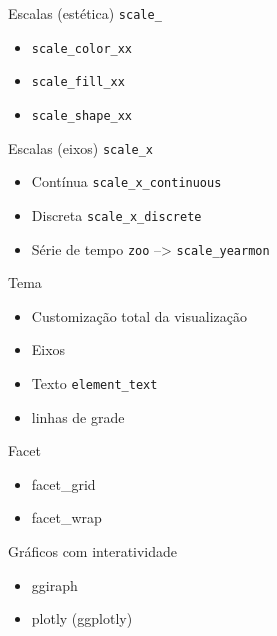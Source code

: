 \documentclass[
  9pt,
  ignorenonframetext,
]{beamer}
\begin{document}
\begin{frame}[fragile]{Escalas (estética) \texttt{scale\_}}
\protect\hypertarget{escalas-estuxe9tica-scale_}{}
\begin{itemize}
\item
  \texttt{scale\_color\_xx}
\item
  \texttt{scale\_fill\_xx}
\item
  \texttt{scale\_shape\_xx}
\end{itemize}
\end{frame}

\begin{frame}[fragile]{Escalas (eixos) \texttt{scale\_x}}
\protect\hypertarget{escalas-eixos-scale_x}{}
\begin{itemize}
\item
  Contínua \texttt{scale\_x\_continuous}
\item
  Discreta \texttt{scale\_x\_discrete}
\item
  Série de tempo \texttt{zoo} --\textgreater{} \texttt{scale\_yearmon}
\end{itemize}
\end{frame}

\begin{frame}[fragile]{Tema}
\protect\hypertarget{tema}{}
\begin{itemize}
\item
  Customização total da visualização
\item
  Eixos
\item
  Texto \texttt{element\_text}
\item
  linhas de grade
\end{itemize}
\end{frame}

\begin{frame}{Facet}
\protect\hypertarget{facet}{}
\begin{itemize}
\item
  facet\_grid
\item
  facet\_wrap
\end{itemize}
\end{frame}

\begin{frame}{Gráficos com interatividade}
\protect\hypertarget{gruxe1ficos-com-interatividade}{}
\begin{itemize}
\item
  ggiraph
\item
  plotly (ggplotly)
\end{itemize}
\end{frame}
\end{document}
